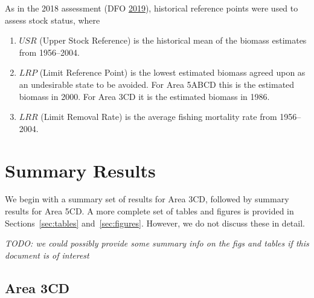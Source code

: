 \documentclass[11pt]{book}
\begin{document}
As in the 2018 assessment (DFO \protect\hyperlink{ref-dfo2019}{2019}), historical reference points were used to assess stock status, where
\begin{enumerate}
\def\labelenumi{\arabic{enumi}.}

\item
  \(USR\) (Upper Stock Reference) is the historical mean of the biomass estimates from 1956--2004.
\item
  \(LRP\) (Limit Reference Point) is the lowest estimated biomass agreed upon as an undesirable state to be avoided. For Area 5ABCD this is the estimated biomass in 2000. For Area 3CD it is the estimated biomass in 1986.
\item
  \(LRR\) (Limit Removal Rate) is the average fishing mortality rate from 1956--2004.
\end{enumerate}
\hypertarget{sec:summary-results}{%
\section{Summary Results}\label{sec:summary-results}}

We begin with a summary set of results for Area 3CD, followed by summary results for Area 5CD. A more complete set of tables and figures is provided in Sections~\ref{sec:tables} and~\ref{sec:figures}. However, we do not discuss these in detail.

\emph{TODO: we could possibly provide some summary info on the figs and tables if this document is of interest}

\hypertarget{area-3cd}{%
\subsection{Area 3CD}\label{area-3cd}}

\clearpage
\end{document}
